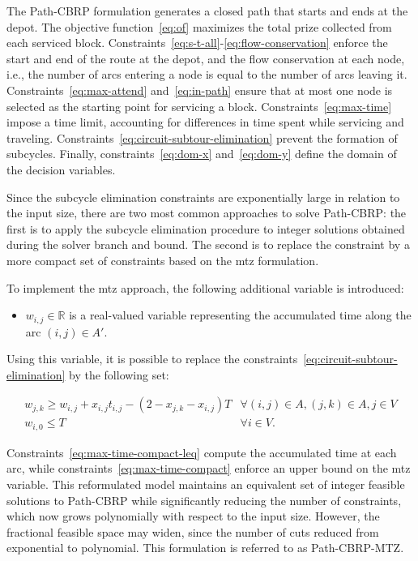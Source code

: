 The Path-CBRP formulation generates a closed path that starts and ends at the
depot. The objective function~\eqref{eq:of} maximizes the total prize collected
from each serviced block.
Constraints~\eqref{eq:s-t-all}-\eqref{eq:flow-conservation} enforce the start
and end of the route at the depot, and the flow conservation at each node, i.e.,
the number of arcs entering a node is equal to the number of arcs leaving it.
Constraints~\eqref{eq:max-attend} and~\eqref{eq:in-path} ensure that at most one
node is selected as the starting point for servicing a block.
Constraints~\eqref{eq:max-time} impose a time limit, accounting for differences
in time spent while servicing and traveling.
Constraints~\eqref{eq:circuit-subtour-elimination} prevent the formation of
subcycles. Finally, constraints~\eqref{eq:dom-x} and~\eqref{eq:dom-y} define the
domain of the decision variables.

Since the subcycle elimination constraints are exponentially large in relation
to the input size, there are two most common approaches to solve Path-CBRP: the
first is to apply the subcycle elimination procedure to integer solutions
obtained during the solver branch and bound. The second is to replace the
constraint by a more compact set of constraints based on the \gls{mtz}
formulation.

To implement the \gls{mtz} approach, the following additional
variable is introduced:

\begin{itemize}
	\item $w_{i, j} \in \mathbb{R}$ is a real-valued variable representing the accumulated
	      time along the arc $(i, j) \in A'$.
\end{itemize}

Using this variable, it is possible to replace the
constraints~\eqref{eq:circuit-subtour-elimination} by the following set:

\begin{align}
	 & w_{j,k} \geq w_{i,j} + x_{i,j}t_{i,j} - (2 - x_{j,k} - x_{i,j})T & \forall (i, j) \in A, (j, k) \in A, j \in V \label{eq:max-time-compact-leq}                               \\
	 & w_{i,0} \leq T                                                   & \forall i \in V.                                                            & \label{eq:max-time-compact}
\end{align}

Constraints~\eqref{eq:max-time-compact-leq} compute the accumulated time at each
arc, while constraints~\eqref{eq:max-time-compact} enforce an upper bound on the
\gls{mtz} variable. This reformulated model maintains an equivalent set of
integer feasible solutions to Path-CBRP while significantly reducing the number
of constraints, which now grows polynomially with respect to the input size.
However, the fractional feasible space may widen, since the number of cuts
reduced from exponential to polynomial. This formulation is referred to as
Path-CBRP-MTZ.

